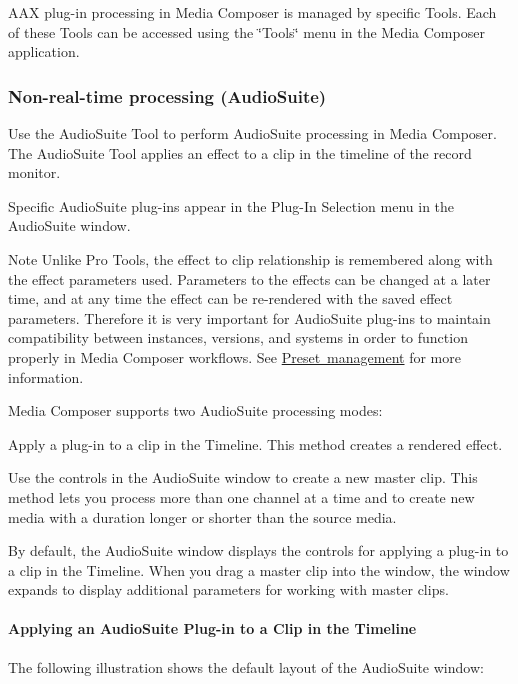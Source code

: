 A\+AX plug-\/in processing in Media Composer is managed by specific Tools. Each of these Tools can be accessed using the \char`\"{}\+Tools\char`\"{} menu in the Media Composer application.

\hypertarget{a00831_subsection__media_composer_guide__audiosuite}{}\subsubsection{Non-\/real-\/time processing (\+Audio\+Suite)}\label{a00831_subsection__media_composer_guide__audiosuite}
 Use the Audio\+Suite Tool to perform Audio\+Suite processing in Media Composer. The Audio\+Suite Tool applies an effect to a clip in the timeline of the record monitor.

Specific Audio\+Suite plug-\/ins appear in the Plug-\/\+In Selection menu in the Audio\+Suite window.

\begin{DoxyNote}{Note}
Unlike Pro Tools, the effect to clip relationship is remembered along with the effect parameters used. Parameters to the effects can be changed at a later time, and at any time the effect can be re-\/rendered with the saved effect parameters. Therefore it is very important for Audio\+Suite plug-\/ins to maintain compatibility between instances, versions, and systems in order to function properly in Media Composer workflows. See \mbox{\hyperlink{a00831_subsection__aax_media_composer_guide__features__presets}{Preset management}} for more information.
\end{DoxyNote}
Media Composer supports two Audio\+Suite processing modes\+: 
\begin{DoxyItemize}
\item Apply a plug-\/in to a clip in the Timeline. This method creates a rendered effect.  
\item Use the controls in the Audio\+Suite window to create a new master clip. This method lets you process more than one channel at a time and to create new media with a duration longer or shorter than the source media.  
\end{DoxyItemize}

By default, the Audio\+Suite window displays the controls for applying a plug-\/in to a clip in the Timeline. When you drag a master clip into the window, the window expands to display additional parameters for working with master clips.

\hypertarget{a00831_subsubsection__media_composer_guide__audiosuite_apply_to_clip}{}\paragraph{Applying an Audio\+Suite Plug-\/in to a Clip in the Timeline}\label{a00831_subsubsection__media_composer_guide__audiosuite_apply_to_clip}
 The following illustration shows the default layout of the Audio\+Suite window\+:

